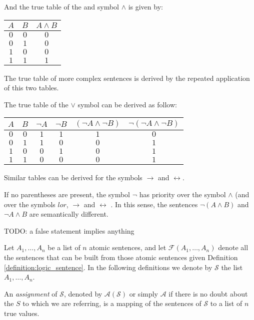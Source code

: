 And the true table of the and symbol $\land$ is given by:

\begin{center}
\begin{tabular}{ c | c | c }
 $A$ & $B$ & $A \land B$ \\
 \hline
 $0$ & $0$ & $0$ \\
 $0$ & $1$ & $0$ \\
 $1$ & $0$ & $0$ \\
 $1$ & $1$ & $1$   
\end{tabular}
\end{center}

The true table of more complex sentences is derived by the repeated application of this two tables.

\begin{example}
The true table of the $\lor$ symbol can be derived as follow:
\begin{center}
\begin{tabular}{ c | c | c | c | c | c}
 $A$ & $B$ & $\lnot A$ & $\lnot B$ & $( \lnot A \land \lnot B)$ & $\lnot ( \lnot A \land \lnot B)$ \\
 \hline
 $0$ & $0$ & $1$ & $1$ & $1$ & $0$ \\
 $0$ & $1$ & $1$ & $0$ & $0$ & $1$ \\
 $1$ & $0$ & $0$ & $1$ & $0$ & $1$ \\
 $1$ & $1$ & $0$ & $0$ & $0$ & $1$
\end{tabular}
\end{center}
Similar tables can be derived for the symbols $\rightarrow$ and $\leftrightarrow$. 
\end{example}

If no parentheses are present, the symbol $\lnot$ has priority over the symbol $\land$ (and over the symbols $lor$, $\rightarrow$ and $\leftrightarrow$ . In this sense, the sentences $\lnot ( A \land B )$ and $\lnot A \land B$ are semantically different.

{\color{red} TODO: a false statement implies anything}

Let $A_1, \ldots, A_n$ be a list of $n$ atomic sentences, and let $\mathcal{F}(A_1, \ldots, A_n)$ denote all the sentences that can be built from those atomic sentences given Definition \ref{definition:logic_sentence}. In the following definitions we denote by $\mathcal{S}$ the list $A_1, \ldots, A_n$. 

\begin{definition}
An \emph{assignment} of $\mathcal{S}$, denoted by $\mathcal{A}(\mathcal{S})$ or simply $\mathcal{A}$ if there is no doubt about the $S$ to which we are referring, is a mapping of the sentences of $\mathcal{S}$ to a list of $n$ true values. 
\end{definition}

